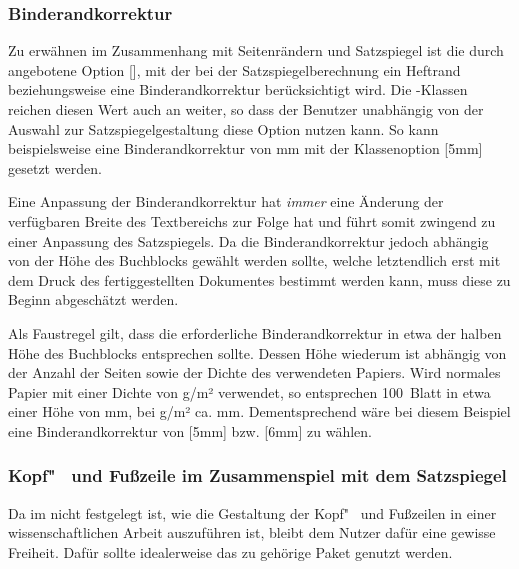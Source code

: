 \subsubsection{Binderandkorrektur}
%
%
Zu erwähnen im Zusammenhang mit Seitenrändern und Satzspiegel ist die durch 
 angebotene Option [], mit der bei 
der Satzspiegelberechnung ein Heftrand beziehungsweise eine Binderandkorrektur 
berücksichtigt wird. Die \TUDScript-Klassen reichen diesen Wert auch an 
 weiter, so dass der Benutzer unabhängig von der Auswahl zur 
Satzspiegelgestaltung diese Option nutzen kann. So kann beispielsweise eine 
Binderandkorrektur von \unit[5]{mm} mit der Klassenoption [5mm] 
gesetzt werden.

Eine Anpassung der Binderandkorrektur hat \emph{immer} eine Änderung der 
verfügbaren Breite des Textbereichs zur Folge hat und führt somit zwingend zu 
einer Anpassung des Satzspiegels. Da die Binderandkorrektur jedoch abhängig von 
der Höhe des Buchblocks gewählt werden sollte, welche letztendlich erst mit dem 
Druck des fertiggestellten Dokumentes bestimmt werden kann, muss diese zu 
Beginn abgeschätzt werden.
%
\begin{Example}
Als Faustregel gilt, dass die erforderliche Binderandkorrektur in etwa der 
halben Höhe des Buchblocks entsprechen sollte. Dessen Höhe wiederum ist 
abhängig von der Anzahl der Seiten sowie der Dichte des verwendeten Papiers. 
Wird normales Papier mit einer Dichte von \unit[80]{g/m²} verwendet, so 
entsprechen 100~Blatt in etwa einer Höhe von \unit[10]{mm}, bei 
\unit[100]{g/m²} ca. \unit[12]{mm}. Dementsprechend wäre bei diesem Beispiel 
eine Binderandkorrektur von [5mm] bzw. [6mm] zu 
wählen.
\end{Example}

\subsubsection{Kopf"~ und Fußzeile im Zusammenspiel mit dem Satzspiegel}
%
%
Da im \CD nicht festgelegt ist, wie die Gestaltung der Kopf"~ und Fußzeilen in 
einer wissenschaftlichen Arbeit auszuführen ist, bleibt dem Nutzer dafür eine 
gewisse Freiheit. Dafür sollte idealerweise das zu \KOMAScript{} gehörige Paket 
 genutzt werden. 

